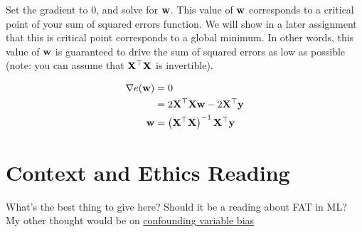 \documentclass[assignment01_Solutions]{subfiles}
\begin{document}
\begin{exercise}[60 minutes]
\item Set the gradient to 0, and solve for $\mathbf{w}$.  This value of $\mathbf{w}$ corresponds to a critical point of your sum of squared errors function.  We will show in a later assignment that this is critical point corresponds to a global minimum.  In other words, this value of $\mathbf{w}$ is guaranteed to drive the sum of squared errors as low as possible (note: you can assume that $\mathbf{X}^\top \mathbf{X}$ is invertible).

\begin{boxedsolution}
\begin{align}
\nabla e(\mathbf{w})  &= 0 \\
&= 2 \mathbf{X}^\top \mathbf{X} \mathbf{w} - 2 \mathbf{X}^\top \mathbf{y}\\
\mathbf{w} &= \left ( \mathbf{X}^\top \mathbf{X} \right )^{-1} \mathbf{X}^\top \mathbf{y}
\end{align}
\end{boxedsolution}
\fi

\ees
\end{exercise}
%



\section{Context and Ethics Reading}
What's the best thing to give here?  Should it be a reading about FAT in ML?  My other thought would be on \href{https://statisticsbyjim.com/regression/confounding-variables-bias/}{confounding variable bias}
\end{document}
